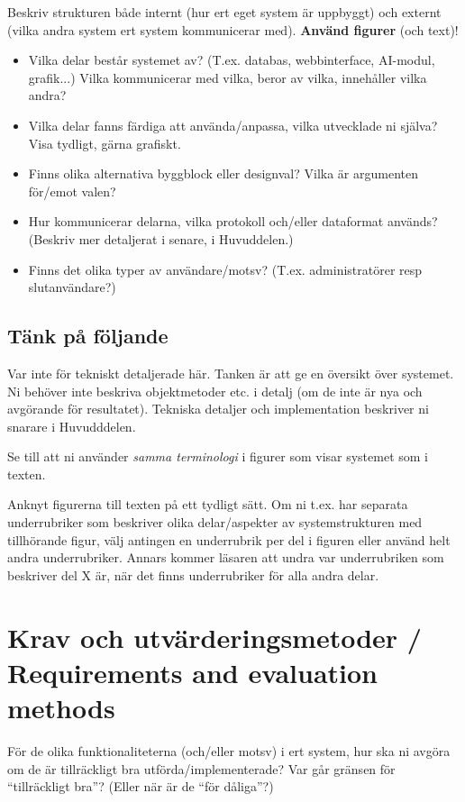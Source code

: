 \documentclass[a4paper,12pt]{article}
\begin{document}
Beskriv strukturen både internt (hur ert eget system är uppbyggt) och externt (vilka andra system ert system kommunicerar med). \textbf{Använd figurer} (och text)!
\begin{itemize}
\item Vilka delar består systemet av? (T.ex. databas, webbinterface, AI-modul, grafik...) Vilka kommunicerar med vilka, beror av vilka, innehåller vilka andra?
\item Vilka delar fanns färdiga att använda/anpassa, vilka utvecklade ni själva? Visa tydligt, gärna grafiskt.
\item Finns olika alternativa byggblock eller designval? Vilka är argumenten för/emot valen?
\item Hur kommunicerar delarna, vilka protokoll och/eller dataformat används? (Beskriv mer detaljerat i senare, i Huvuddelen.)
\item Finns det olika typer av användare/motsv? (T.ex. administratörer resp slut\-an\-vän\-dare?)
\end{itemize}

\subsection{Tänk på följande}

Var inte för tekniskt detaljerade här.  Tanken är att ge en översikt över systemet.  Ni behöver inte beskriva objektmetoder etc. i detalj (om de inte är nya och avgörande för resultatet). Tekniska detaljer och implementation beskriver ni snarare i Huvudddelen.

Se till att ni använder \emph{samma terminologi} i figurer som visar systemet som i texten. 

Anknyt figurerna till texten på ett tydligt sätt. Om ni t.ex. har separata underrubriker som beskriver olika delar/aspekter av systemstrukturen med tillhörande figur, välj antingen en underrubrik per del i figuren eller använd helt andra underrubriker.  Annars kommer läsaren att undra var underrubriken som beskriver del X är, när det finns underrubriker för alla andra delar.

\section{Krav och utvärderingsmetoder / Requirements and evaluation methods}\label{sec:krav}

För de olika funktionaliteterna (och/eller motsv) i ert system, hur ska ni avgöra om de är tillräckligt bra utförda/implementerade? Var går gränsen för ``tillräckligt bra''? (Eller när är de ``för dåliga''?)
\end{document}
